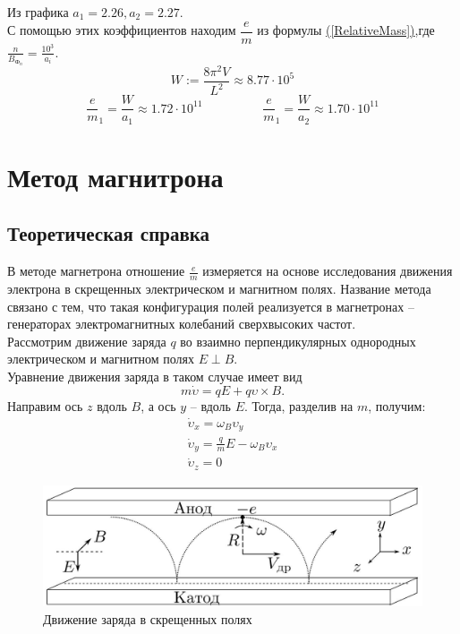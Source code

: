 \documentclass[a4paper]{article}
\begin{document}
Из графика $a_1 = 2.26, a_2 = 2.27$.\\
С помощью этих коэффициентов находим $\dfrac{e}{m}$ из формулы \hyperref[RelativeMass]{(\ref{RelativeMass})},где $\frac{n}{B_{\text{Ф}_n}} = \frac{10^3}{a_i}$.\\
\[W := \frac{8\pi^2V}{L^2} \approx 8.77 \cdot10^5\]
\[\frac{e}{m}_1 = \frac{W}{a_1} \approx 1.72 \cdot 10^{11}\hspace{2cm}\frac{e}{m}_1 = \frac{W}{a_2} \approx 1.70 \cdot 10^{11}\]


\clearpage
\section*{Метод магнитрона}
\subsection*{Теоретическая справка}
В методе магнетрона отношение $\frac{e}{m}$ измеряется на основе исследования движения электрона в скрещенных электрическом и магнитном полях. Название метода связано с тем, что такая конфигурация полей реализуется в магнетро­нах -- генераторах электромагнитных колебаний сверхвысоких частот.\\
Рассмотрим движение заряда $q$ во взаимно перпендикулярных однородных электрическом и магнитном полях $E\perp B$.\\
Уравнение движения заряда в таком случае имеет вид
\[m\dot{\upsilon} = qE + q\upsilon\times B.\]
Направим ось $z$ вдоль $B$, а ось $y$ -- вдоль $E$. Тогда, разделив на $m$, получим:
\begin{equation}\label{cycloid}
\begin{aligned}
	&\dot{\upsilon}_x = \omega_B \upsilon_y&\\
	&\dot{\upsilon}_y = \frac{q}{m}E - \omega_B \upsilon_x&\\
	&\dot{\upsilon}_z = 0&
\end{aligned}
\end{equation}

\begin{figure}[h]
	\begin{center}
		\includegraphics[width = \textwidth]{ДвижВСкрещПолях}
		\caption{Движение заряда в скрещенных полях}
	\end{center}
\end{figure}
\end{document}
